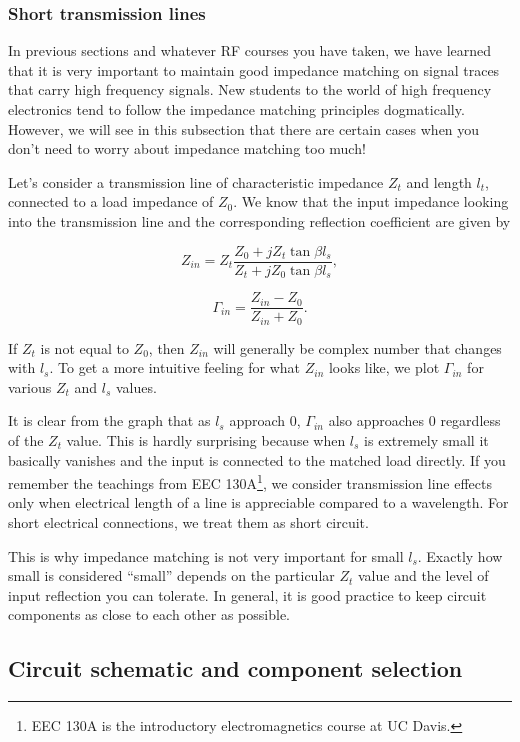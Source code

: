 \documentclass[12pt,letterpaper]{scrartcl}
\begin{document}
\subsubsection{Short transmission lines}\label{sec:short-tline}

In previous sections and whatever RF courses you have taken, we have learned that it is very important to maintain good impedance matching on signal traces that carry high frequency signals. New students to the world of high frequency electronics tend to follow the impedance matching principles dogmatically. However, we will see in this subsection that there are certain cases when you don't need to worry about impedance matching too much!

Let's consider a transmission line of characteristic impedance $Z_t$ and length $l_t$, connected to a load impedance of $Z_0$. We know that the input impedance looking into the transmission line and the corresponding reflection coefficient are given by

\[
Z_{in} = Z_t \frac{Z_0 + j Z_t \tan \beta l_s}{Z_t + j Z_0 \tan \beta l_s},
\]

\[
\Gamma_{in} = \frac{Z_{in}-Z_0}{Z_{in}+Z_0}.
\]

If $Z_t$ is not equal to $Z_0$, then $Z_{in}$ will generally be complex number that changes with $l_s$. To get a more intuitive feeling for what $Z_{in}$ looks like, we plot $\Gamma_{in}$ for various $Z_t$ and $l_s$ values. 

It is clear from the graph that as $l_s$ approach 0, $\Gamma_{in}$ also approaches 0 regardless of the $Z_t$ value. This is hardly surprising because when $l_s$ is extremely small it basically vanishes and the input is connected to the matched load directly. If you remember the teachings from EEC 130A\footnote{EEC 130A is the introductory electromagnetics course at UC Davis.}, we consider transmission line effects only when electrical length of a line is appreciable compared to a wavelength. For short electrical connections, we treat them as short circuit. 

This is why impedance matching is not very important for small $l_s$. Exactly how small is considered ``small'' depends on the particular $Z_t$ value and the level of input reflection you can tolerate. In general, it is good practice to keep circuit components as close to each other as possible. 

\subsection{Circuit schematic and component selection}
\end{document}
